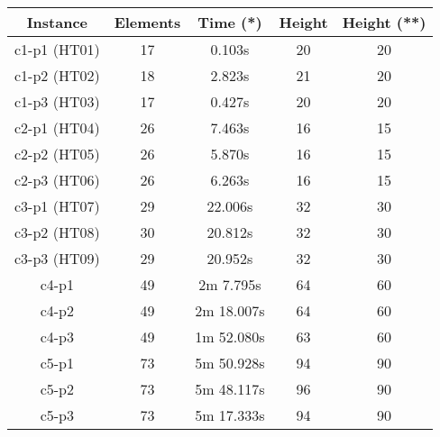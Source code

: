 \begin{table}[h!t]
    \centering
    \small
    \begin{tabular}{|c|c|c|c|c|}
        \hline
        \textbf{Instance} & \textbf{Elements} & \textbf{Time (*)} & \textbf{Height} & \textbf{Height (**)} \\ \hline
        c1-p1 (HT01)      & 17                & 0.103s        & 20              & 20                  \\ \hline
        c1-p2 (HT02)      & 18                & 2.823s        & 21              & 20                  \\ \hline
        c1-p3 (HT03)      & 17                & 0.427s        & 20              & 20                  \\ \hline
        c2-p1 (HT04)      & 26                & 7.463s        & 16              & 15                  \\ \hline
        c2-p2 (HT05)      & 26                & 5.870s        & 16              & 15                  \\ \hline
        c2-p3 (HT06)      & 26                & 6.263s        & 16              & 15                  \\ \hline
        c3-p1 (HT07)      & 29                & 22.006s       & 32              & 30                  \\ \hline
        c3-p2 (HT08)      & 30                & 20.812s       & 32              & 30                  \\ \hline
        c3-p3 (HT09)      & 29                & 20.952s       & 32              & 30                  \\ \hline
        c4-p1             & 49                & 2m 7.795s     & 64              & 60                  \\ \hline
        c4-p2             & 49                & 2m 18.007s    & 64              & 60                  \\ \hline
        c4-p3             & 49                & 1m 52.080s    & 63              & 60                  \\ \hline
        c5-p1             & 73                & 5m 50.928s    & 94              & 90                  \\ \hline
        c5-p2             & 73                & 5m 48.117s    & 96              & 90                  \\ \hline
        c5-p3             & 73                & 5m 17.333s    & 94              & 90                  \\ \hline

\end{tabular}
\end{table}
